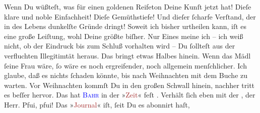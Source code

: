                Wenn Du wüßteſt, was für einen goldenen Reifeton Deine Kunſt jetzt hat! Dieſe klare
               und noble Einfachheit! Dieſe Gemüthstiefe! Und dieſer ſcharfe Verſtand, der in des
               Lebens dunkelſte Gründe dringt! Soweit ich bisher urtheilen kann, iſt es eine große
               Leiſtung, wohl Deine größte biſher. Nur Eines meine ich – ich weiß nicht, ob der
               Eindruck bis zum Schluß vorhalten wird – Du ſollteſt aus der verfluchten Illegitimtät
               heraus. Das bringt etwas {\pb}Halbes hinein. Wenn das
               Mädl ſeine Frau wäre, ſo \strikeout{\textcolor{gray}{×}} wäre es noch ergreifender, noch allgemein menſchlicher. Ich glaube, daß es
               nichts ſchaden könnte, bis nach Weihnachten mit dem Buche zu warten. Vor
                  Weihnachten kommſt Du in den großen Schwall hinein, nachher tritt es
               beſſer hervor.\pend
           \pstart
           Das \label{K_L02616-777v}\label{K_L02616-777h}
               hat \textsc{\textcolor{blue}{Bahr}{}\ledrightnote{\textcolor{blue}{Hermann Bahr}}} in der »\textcolor{brown}{Zeit}{}\ledrightnote{\textcolor{brown}{Die Zeit. Wiener Wochenschrift}}« feſt \label{K_L02616-456v}\label{K_L02616-456h}. Verhält ſich eben mit der \label{K_L02616-98v}\label{K_L02616-98h}, der Herr. Pfui, pfui!\pend
           \pstart
           Das »\textcolor{brown}{Journal}{}\ledrightnote{\textcolor{brown}{Le Journal}}« iſt, ſeit Du es abonnirt haſt,
